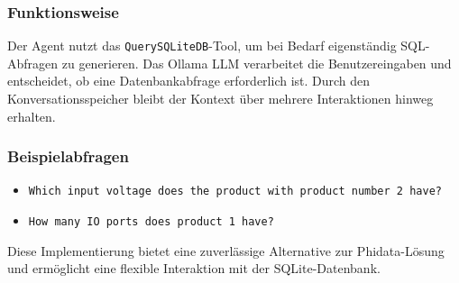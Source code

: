 \subsubsection{Funktionsweise}
Der Agent nutzt das \texttt{QuerySQLiteDB}-Tool, um bei Bedarf eigenständig SQL-Abfragen zu generieren. Das Ollama LLM verarbeitet die Benutzereingaben und entscheidet, ob eine Datenbankabfrage erforderlich ist. Durch den Konversationsspeicher bleibt der Kontext über mehrere Interaktionen hinweg erhalten.

\subsubsection{Beispielabfragen}
\begin{itemize}
    \item \texttt{Which input voltage does the product with product number 2 have?}
    \item \texttt{How many IO ports does product 1 have?}
\end{itemize}

Diese Implementierung bietet eine zuverlässige Alternative zur Phidata-Lösung und ermöglicht eine flexible Interaktion mit der SQLite-Datenbank.
